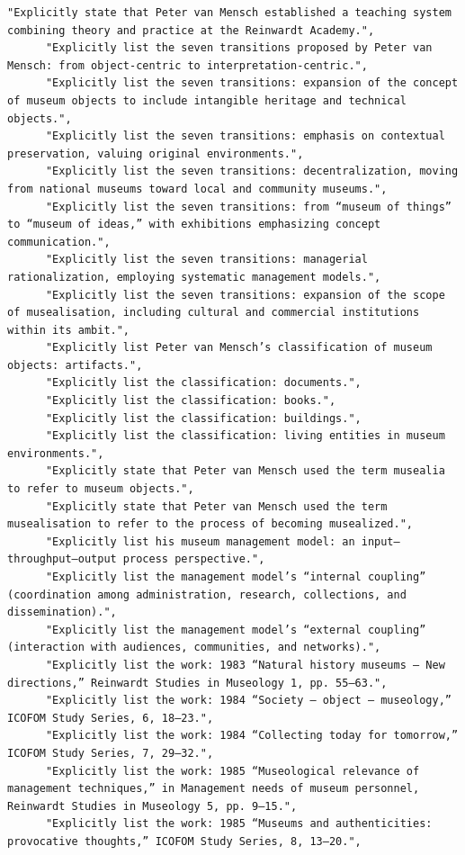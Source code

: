\documentclass[11pt]{article}
\begin{document}
\begin{tcolorbox}[
  breakable,
  colback=porcelain,
  colframe=gray!75!black,
  left=6pt, right=6pt, top=6pt, bottom=6pt,
  fontupper=\small
]
\begin{lstlisting}[basicstyle=\ttfamily\footnotesize, breaklines=true, frame=none, numbers=none]
      "Explicitly state that Peter van Mensch established a teaching system combining theory and practice at the Reinwardt Academy.",
      "Explicitly list the seven transitions proposed by Peter van Mensch: from object-centric to interpretation-centric.",
      "Explicitly list the seven transitions: expansion of the concept of museum objects to include intangible heritage and technical objects.",
      "Explicitly list the seven transitions: emphasis on contextual preservation, valuing original environments.",
      "Explicitly list the seven transitions: decentralization, moving from national museums toward local and community museums.",
      "Explicitly list the seven transitions: from “museum of things” to “museum of ideas,” with exhibitions emphasizing concept communication.",
      "Explicitly list the seven transitions: managerial rationalization, employing systematic management models.",
      "Explicitly list the seven transitions: expansion of the scope of musealisation, including cultural and commercial institutions within its ambit.",
      "Explicitly list Peter van Mensch’s classification of museum objects: artifacts.",
      "Explicitly list the classification: documents.",
      "Explicitly list the classification: books.",
      "Explicitly list the classification: buildings.",
      "Explicitly list the classification: living entities in museum environments.",
      "Explicitly state that Peter van Mensch used the term musealia to refer to museum objects.",
      "Explicitly state that Peter van Mensch used the term musealisation to refer to the process of becoming musealized.",
      "Explicitly list his museum management model: an input–throughput–output process perspective.",
      "Explicitly list the management model’s “internal coupling” (coordination among administration, research, collections, and dissemination).",
      "Explicitly list the management model’s “external coupling” (interaction with audiences, communities, and networks).",
      "Explicitly list the work: 1983 “Natural history museums – New directions,” Reinwardt Studies in Museology 1, pp. 55–63.",
      "Explicitly list the work: 1984 “Society – object – museology,” ICOFOM Study Series, 6, 18–23.",
      "Explicitly list the work: 1984 “Collecting today for tomorrow,” ICOFOM Study Series, 7, 29–32.",
      "Explicitly list the work: 1985 “Museological relevance of management techniques,” in Management needs of museum personnel, Reinwardt Studies in Museology 5, pp. 9–15.",
      "Explicitly list the work: 1985 “Museums and authenticities: provocative thoughts,” ICOFOM Study Series, 8, 13–20.",

\end{lstlisting}
\end{tcolorbox}
\end{document}
